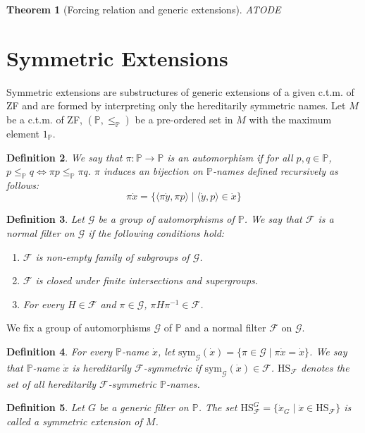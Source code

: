 \documentclass{report}
\newtheorem{thm}{Theorem}[chapter]
\newtheorem{dfn}[thm]{Definition}
\newcommand{\Pbb}{\mathbb{P}}
\newcommand{\Gcal}{\mathcal{G}}
\newcommand{\Fcal}{\mathcal{F}}
\begin{document}
\begin{thm} [Forcing relation and generic extensions]
  ATODE
\end{thm}

\section{Symmetric Extensions}
Symmetric extensions are substructures of generic extensions of a given c.t.m. of ZF 
and are formed by interpreting only the hereditarily symmetric names.
Let $M$ be a c.t.m. of ZF, $(\Pbb, \leq_{\Pbb})$ be a pre-ordered set in $M$ with the maximum element $1_{\Pbb}$.


\begin{dfn} 
  We say that $\pi : \Pbb \rightarrow \Pbb$ is an \emph{automorphism} if for all $p, q \in \Pbb$, $p \leq_{\Pbb} q \Leftrightarrow \pi p \leq_{\Pbb} \pi q$.
  $\pi$ induces an bijection on $\Pbb$-names defined recursively as follows:
  $$ \pi \dot{x} = \{ \langle \pi \dot{y}, \pi p \rangle \mid \langle \dot{y}, p \rangle \in \dot{x} \} $$
\end{dfn}

\begin{dfn} %
  Let $\Gcal$ be a group of automorphisms of $\Pbb$. We say that $\Fcal$ is a \emph{normal filter} on $\Gcal$ if the following conditions hold:
  \begin{enumerate}
    \item $\Fcal$ is non-empty family of subgroups of $\Gcal$.
    \item $\Fcal$ is closed under finite intersections and supergroups.
    \item For every $H \in \Fcal$ and $\pi \in \Gcal$, $\pi H \pi^{-1} \in \Fcal$.
  \end{enumerate}
\end{dfn}

We fix a group of automorphisms $\Gcal$ of $\Pbb$ and a normal filter $\Fcal$ on $\Gcal$.
\begin{dfn} 
  For every $\Pbb$-name $\dot{x}$, let $\text{sym}_{\Gcal}(\dot{x}) = \{ \pi \in \Gcal \mid \pi \dot{x} = \dot{x} \}$.
  We say that $\Pbb$-name $\dot{x}$ is \emph{hereditarily $\Fcal$-symmetric} if $\text{sym}_{\Gcal}(\dot{x}) \in \Fcal$.
  $\text{HS}_{\Fcal}$ denotes the set of all hereditarily $\Fcal$-symmetric $\Pbb$-names.
\end{dfn}

\begin{dfn} 
  Let $G$ be a generic filter on $\Pbb$. The set $\text{HS}^{G}_{\Fcal} = \{ \dot{x}_G \mid \dot{x} \in \text{HS}_{\Fcal} \}$ is called a \emph{symmetric extension} of $M$.
\end{dfn}
\end{document}
